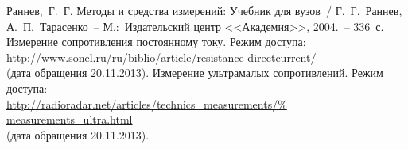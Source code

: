 \documentclass[pscyr,titlepage]{hedreport}
\begin{document}
  \maketitle
  \tableofcontents

  \pagebreak
  \renewcommand{\bibname}{Список литературы}

  \begin{thebibliography}{9} 
     Раннев,~Г.~Г. Методы и средства измерений: Учебник для вузов~/
      Г.~Г.~Раннев, А.~П.~Тарасенко~-- М.:~Издательский центр <<Академия>>,
      2004.~-- 336~с.
     Измерение сопротивления постоянному току. Режим доступа:\\
      \url{http://www.sonel.ru/ru/biblio/article/resistance-directcurrent/}\\
      (дата обращения 20.11.2013).
     Измерение ультрамалых сопротивлений. Режим доступа:\\
      \url{http://radioradar.net/articles/technics_measurements/%
      measurements_ultra.html}\\
      (дата обращения 20.11.2013).
  \end{thebibliography}
\end{document}
